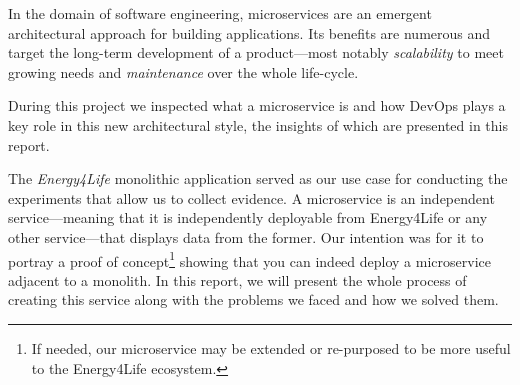   

In the domain of software engineering, microservices are an emergent
architectural approach for building applications. Its benefits are
numerous and target the long-term development of a product---most
notably \emph{scalability} to meet growing needs and
\emph{maintenance} over the whole life-cycle.

During this project we inspected what a microservice is and how DevOps
plays a key role in this new architectural style, the insights of
which are presented in this report.

The \emph{Energy4Life} monolithic application served as our use case
for conducting the experiments that allow us to collect evidence. A
microservice is an independent
service---meaning that it is independently deployable from Energy4Life
or any other service---that displays data from the former.  Our
intention was for it to portray a proof of concept\footnote{If needed,
our microservice may be extended or re-purposed to be more useful to
the Energy4Life ecosystem.} showing that you can indeed deploy a
microservice adjacent to a monolith.  In this report, we will present
the whole process of creating this service along with the problems we
faced and how we solved them.
